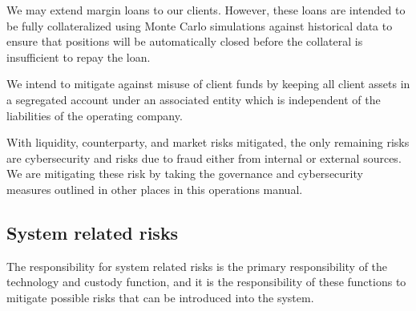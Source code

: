 We may extend margin loans to our clients. However,
these loans are intended to be fully collateralized using Monte Carlo
simulations against historical data to ensure that positions will be
automatically closed before the collateral is insufficient to repay
the loan.

We intend to mitigate against misuse of client funds by keeping all
client assets in a segregated account under an associated entity which
is independent of the liabilities of the operating company.

With liquidity, counterparty, and market risks mitigated, the only
remaining risks are cybersecurity and risks due to fraud either from
internal or external sources.  We are mitigating these risk by taking
the governance and cybersecurity measures outlined in other places in
this operations manual.

\subsection{System related risks}
The responsibility for system related risks is the primary
responsibility of the technology and custody function, and it is
the responsibility of these functions to mitigate possible risks that can
be introduced into the system.
